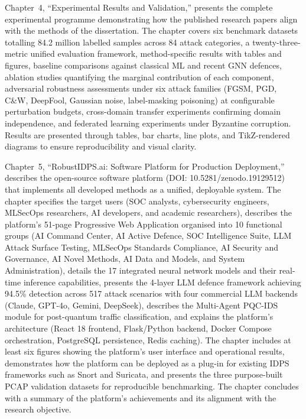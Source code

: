 Chapter~4, ``Experimental Results and Validation,'' presents the complete experimental programme demonstrating how the published research papers align with the methods of the dissertation. The chapter covers six benchmark datasets totalling 84.2 million labelled samples across 84 attack categories, a twenty-three-metric unified evaluation framework, method-specific results with tables and figures, baseline comparisons against classical ML and recent GNN defences, ablation studies quantifying the marginal contribution of each component, adversarial robustness assessments under six attack families (FGSM, PGD, C\&W, DeepFool, Gaussian noise, label-masking poisoning) at configurable perturbation budgets, cross-domain transfer experiments confirming domain independence, and federated learning experiments under Byzantine corruption. Results are presented through tables, bar charts, line plots, and TikZ-rendered diagrams to ensure reproducibility and visual clarity.

Chapter~5, ``RobustIDPS.ai: Software Platform for Production Deployment,'' describes the open-source software platform (DOI: 10.5281/zenodo.19129512) that implements all developed methods as a unified, deployable system. The chapter specifies the target users (SOC analysts, cybersecurity engineers, MLSecOps researchers, AI developers, and academic researchers), describes the platform's 51-page Progressive Web Application organised into 10 functional groups (AI Command Center, AI Active Defence, SOC Intelligence Suite, LLM Attack Surface Testing, MLSecOps Standards Compliance, AI Security and Governance, AI Novel Methods, AI Data and Models, and System Administration), details the 17 integrated neural network models and their real-time inference capabilities, presents the 4-layer LLM defence framework achieving 94.5\% detection across 517 attack scenarios with four commercial LLM backends (Claude, GPT-4o, Gemini, DeepSeek), describes the Multi-Agent PQC-IDS module for post-quantum traffic classification, and explains the platform's architecture (React 18 frontend, Flask/Python backend, Docker Compose orchestration, PostgreSQL persistence, Redis caching). The chapter includes at least six figures showing the platform's user interface and operational results, demonstrates how the platform can be deployed as a plug-in for existing IDPS frameworks such as Snort and Suricata, and presents the three purpose-built PCAP validation datasets for reproducible benchmarking. The chapter concludes with a summary of the platform's achievements and its alignment with the research objective.

